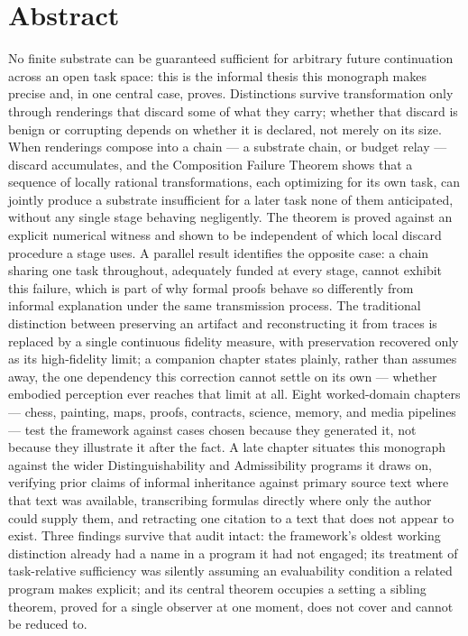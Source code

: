 \chapter*{Abstract}

No finite substrate can be guaranteed sufficient for arbitrary future
continuation across an open task space: this is the informal thesis this
monograph makes precise and, in one central case, proves. Distinctions
survive transformation only through renderings that discard some of what
they carry; whether that discard is benign or corrupting depends on
whether it is declared, not merely on its size. When renderings compose
into a chain --- a substrate chain, or budget relay --- discard
accumulates, and the Composition Failure Theorem shows that a sequence of
locally rational transformations, each optimizing for its own task, can
jointly produce a substrate insufficient for a later task none of them
anticipated, without any single stage behaving negligently. The theorem
is proved against an explicit numerical witness and shown to be
independent of which local discard procedure a stage uses. A parallel
result identifies the opposite case: a chain sharing one task throughout,
adequately funded at every stage, cannot exhibit this failure, which is
part of why formal proofs behave so differently from informal
explanation under the same transmission process. The traditional
distinction between preserving an artifact and reconstructing it from
traces is replaced by a single continuous fidelity measure, with
preservation recovered only as its high-fidelity limit; a companion
chapter states plainly, rather than assumes away, the one dependency this
correction cannot settle on its own --- whether embodied perception ever
reaches that limit at all. Eight worked-domain chapters --- chess,
painting, maps, proofs, contracts, science, memory, and media pipelines
--- test the framework against cases chosen because they generated it,
not because they illustrate it after the fact. A late chapter situates this monograph
against the wider Distinguishability and Admissibility programs it draws
on, verifying prior claims of informal inheritance against primary
source text where that text was available, transcribing formulas
directly where only the author could supply them, and retracting one
citation to a text that does not appear to exist. Three findings survive
that audit intact: the framework's oldest working distinction already
had a name in a program it had not engaged; its treatment of
task-relative sufficiency was silently assuming an evaluability condition
a related program makes explicit; and its central theorem occupies a
setting a sibling theorem, proved for a single observer at one moment,
does not cover and cannot be reduced to.

